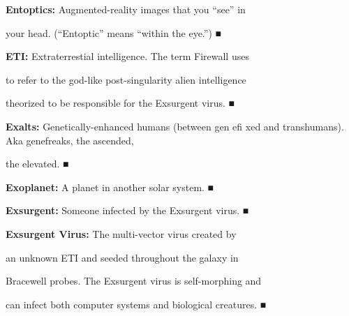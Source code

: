 \textbf{ Entoptics:} Augmented-reality images that you ``see'' in 

your head. (``Entoptic'' means ``within the eye.'')
■

\textbf{ ETI:} Extraterrestial intelligence. The term Firewall uses 

to refer to the god-like post-singularity alien intelligence 

theorized to be responsible for the Exsurgent virus.
■

\textbf{ Exalts:} Genetically-enhanced humans (between gen
eﬁ xed and transhumans). Aka genefreaks, the ascended, 

the elevated.
■

\textbf{ Exoplanet:} A planet in another solar system.
■

\textbf{ Exsurgent:} Someone infected by the Exsurgent virus.
■

\textbf{ Exsurgent Virus:} The multi-vector virus created by 

an unknown ETI and seeded throughout the galaxy in 

Bracewell probes. The Exsurgent virus is self-morphing and 

can infect both computer systems and biological creatures.
■

